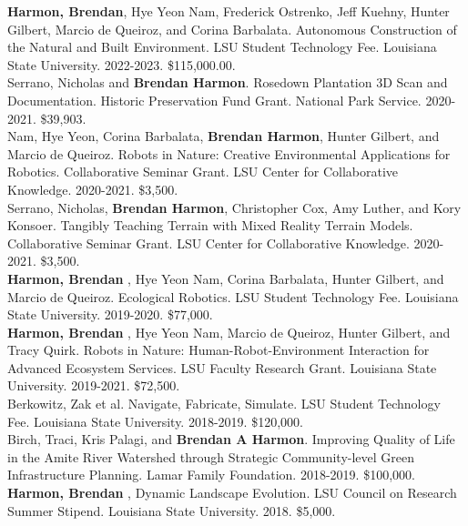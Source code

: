 \documentclass[10pt]{developercv} %
\begin{document}
\textbf{Harmon, Brendan}, Hye Yeon Nam, Frederick Ostrenko, Jeff Kuehny, Hunter Gilbert, Marcio de Queiroz, and Corina Barbalata. 
Autonomous Construction of the Natural and Built Environment.
LSU Student Technology Fee. Louisiana State University. 
2022-2023. \$115,000.00.\\

Serrano, Nicholas and \textbf{Brendan Harmon}. 
Rosedown Plantation 3D Scan and Documentation. 
Historic Preservation Fund Grant. National Park Service. 
2020-2021. \$39,903.\\

Nam, Hye Yeon, Corina Barbalata, \textbf{Brendan Harmon}, Hunter Gilbert, and Marcio de Queiroz.
Robots in Nature: Creative Environmental Applications for Robotics.
Collaborative Seminar Grant. LSU Center for Collaborative Knowledge.
2020-2021. \$3,500.\\

Serrano, Nicholas, \textbf{Brendan Harmon}, Christopher Cox, Amy Luther, and Kory Konsoer.
Tangibly Teaching Terrain with Mixed Reality Terrain Models.
Collaborative Seminar Grant. LSU Center for Collaborative Knowledge.
2020-2021. \$3,500.\\

\textbf{Harmon, Brendan }, Hye Yeon Nam, Corina Barbalata, Hunter Gilbert, and Marcio de Queiroz.
Ecological Robotics.
LSU Student Technology Fee. Louisiana State University. 
2019-2020.	\$77,000.\\

\textbf{Harmon, Brendan }, Hye Yeon Nam, Marcio de Queiroz, Hunter Gilbert, and Tracy Quirk. 
Robots in Nature: Human-Robot-Environment Interaction for Advanced Ecosystem Services. 
LSU Faculty Research Grant. Louisiana State University. 
2019-2021. \$72,500.\\

Berkowitz, Zak et al. Navigate, Fabricate, Simulate. 
LSU Student Technology Fee. Louisiana State University. 
2018-2019.	\$120,000.\\

Birch, Traci, Kris Palagi, and \textbf{Brendan A Harmon}. 
Improving Quality of Life in the Amite River Watershed through Strategic Community-level Green Infrastructure Planning. 
Lamar Family Foundation. 
2018-2019. \$100,000.\\

\textbf{Harmon, Brendan }, 
Dynamic Landscape Evolution. 
LSU Council on Research Summer Stipend. Louisiana State University. 
2018. \$5,000.\\
\end{document}
